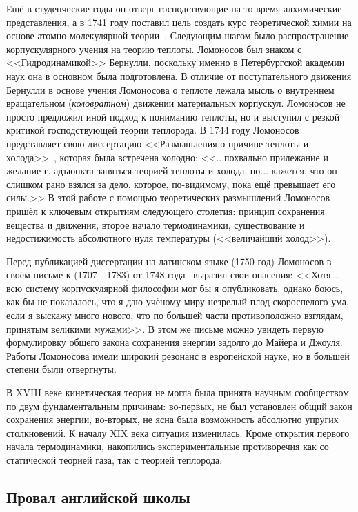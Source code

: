 \documentclass[a4paper, 12pt, oneside]{article} %
\begin{document}
Ещё в студенческие годы он отверг господствующие на то время
алхимические представления, а в 1741 году поставил цель создать курс
теоретической химии на основе атомно-молекулярной
теории~\cite{lomonosov1951chemistry}. Следующим шагом было
распространение корпускулярного учения на теорию теплоты. Ломоносов был
знаком с <<Гидродинамикой>> Бернулли, поскольку именно в Петербургской
академии наук она в основном была подготовлена. В отличие от
поступательного движения Бернулли в основе учения Ломоносова о теплоте
лежала мысль о внутреннем вращательном (\emph{коловратном}) движении
материальных корпускул. Ломоносов не просто предложил иной подход к
пониманию теплоты, но и выступил с резкой критикой господствующей теории
теплорода. В 1744 году Ломоносов представляет свою диссертацию
<<Размышления о причине теплоты и
холода>>~\cite{lomonosov1951speculations}, которая была встречена
холодно: <<...похвально прилежание и желание г. адъюнкта заняться
теорией теплоты и холода, но... кажется, что он слишком рано взялся за
дело, которое, по-видимому, пока ещё превышает его силы.>> В этой работе
с помощью теоретических размышлений Ломоносов пришёл к ключевым
открытиям следующего столетия: принцип сохранения вещества и движения,
второе начало термодинамики, существование и недостижимость абсолютного
нуля температуры (<<величайший холод>>).

Перед публикацией диссертации на латинском языке (1750 год) Ломоносов в
своём письме к  (1707---1783) от 1748
года~\cite{lomonosov1951letter} выразил свои опасения: <<Хотя... всю
систему корпускулярной философии мог бы я опубликовать, однако боюсь,
как бы не показалось, что я даю учёному миру незрелый плод скороспелого
ума, если я выскажу много нового, что по большей части противоположно
взглядам, принятым великими мужами>>. В этом же письме можно увидеть
первую формулировку общего закона сохранения энергии задолго до Майера и
Джоуля. Работы Ломоносова имели широкий резонанс в европейской науке, но
в большей степени были отвергнуты.

В XVIII веке кинетическая теория не могла была принята научным
сообществом по двум фундаментальным причинам: во-первых, не был
установлен общий закон сохранения энергии, во-вторых, не ясна была
возможность абсолютно упругих столкновений. К началу XIX века ситуация
изменилась. Кроме открытия первого начала термодинамики, накопились
экспериментальные противоречия как со статической теорией газа, так с
теорией теплорода.

\subsection{Провал английской школы}
\end{document}
